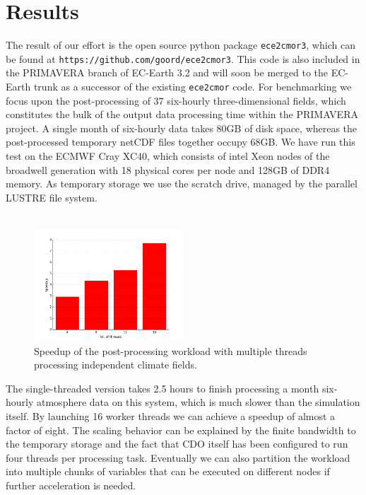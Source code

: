 \documentclass[procedia]{easychair}
\begin{document}
\section{Results}
The result of our effort is the open source python package \texttt{ece2cmor3}, 
which can be found at \texttt{https://github.com/goord/ece2cmor3}. This code is 
also included in the PRIMAVERA branch of EC-Earth 3.2 and will soon be merged 
to the EC-Earth trunk as a successor of the existing \texttt{ece2cmor} code. 
For benchmarking we focus upon the post-processing of 37 six-hourly 
three-dimensional fields, which constitutes the bulk of the output data 
processing time within the PRIMAVERA project. A single month of 
six-hourly data takes 80GB of disk space, whereas the post-processed temporary  
netCDF files together occupy 68GB. We have run this test on the ECMWF Cray XC40, 
which consists of intel Xeon nodes of the broadwell generation with 18 physical 
cores per node and 128GB of DDR4 memory. As temporary storage we use the scratch 
drive, managed by the parallel LUSTRE file system.\\
\\
\begin{figure}[b]
 \centering
 \includegraphics[width=0.5\textwidth]{speedup_chart.png}
 \caption{Speedup of the post-processing workload with multiple threads 
processing independent climate fields.}
\end{figure}
The single-threaded version takes 2.5 hours to finish processing a month 
six-hourly atmosphere data on this system, which is much slower than the 
simulation itself. By launching 16 worker threads we can achieve a speedup of 
almost a factor of eight. The scaling behavior can be explained by the finite 
bandwidth to the temporary storage and the fact that CDO itself has been 
configured to run four threads per processing task. Eventually we can also 
partition the workload into multiple chunks of variables that can be executed 
on different nodes if further acceleration is needed.
\end{document}

